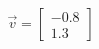 \documentclass[preview]{standalone}
\begin{document}
\begin{align*}
\vec{v}=\begin{bmatrix}-0.8\\1.3\end{bmatrix}
\end{align*}
\end{document}
